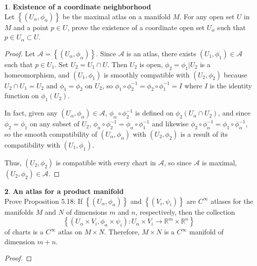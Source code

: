\documentclass[12pt]{article}
\theoremstyle{definition}
\newtheorem{ex}{}[section]
\begin{document}
\begin{ex}
	\textbf{Existence of a coordinate neighborhood} \\
	Let $\left\lbrace \left( U_\alpha, \phi_\alpha \right) \right\rbrace$ be the maximal atlas on a manifold $M$.
	For any open set $U$ in $M$ and a point $p \in U$, prove the existence of a coordinate open set $U_\alpha$ such that $p \in U_\alpha \subset U$.
\end{ex}
\begin{proof}
	Let $\mathcal{A} = \left\lbrace (U_\alpha, \phi_\alpha) \right\rbrace$.
	Since $\mathcal{A}$ is an atlas, there exists $(U_1, \phi_1) \in \mathcal{A}$ such that $p \in U_1$.
	Set $U_2 = U_1 \cap U$.
	Then $U_2$ is open, $\phi_2 = \phi_1|U_2$ is a homeomorphism, and $(U_1, \phi_1)$ is smoothly compatible with $(U_2, \phi_2)$ because $U_2 \cap U_1 = U_2$ and $\phi_1 = \phi_2$ on $U_2$, so $\phi_1 \circ \phi_2^{-1} = \phi_2 \circ \phi_1^{-1} = I$ where $I$ is the identity function on $\phi_1(U_2)$.

	In fact, given any $(U_\alpha, \phi_\alpha) \in \mathcal{A}$, $\phi_\alpha \circ \phi_2^{-1}$ is defined on $\phi_2(U_\alpha \cap U_2)$, and since $\phi_2 = \phi_1$ on any subset of $U_2$, $\phi_\alpha \circ \phi_2^{-1} = \phi_\alpha \circ \phi_1^{-1}$ and likewise $\phi_2 \circ \phi_\alpha^{-1} = \phi_1 \circ \phi_\alpha^{-1}$, so the smooth compatibility of $(U_\alpha, \phi_\alpha)$ with $(U_2, \phi_2)$ is a result of its compatibility with $(U_1, \phi_1)$.

	Thus, $(U_2, \phi_2)$ is compatible with every chart in $\mathcal{A}$, so since $\mathcal{A}$ is maximal, $(U_2, \phi_2) \in \mathcal{A}$.
\end{proof}

\begin{ex}
	\textbf{An atlas for a product manifold} \\
	Prove Proposition 5.18: If $\left\lbrace \left( U_\alpha, \phi_\alpha \right) \right\rbrace$ and $\left\lbrace \left( V_i, \psi_i \right) \right\rbrace$ are $C^\infty$ atlases for the manifolds $M$ and $N$ of dimensions $m$ and $n$, respectively, then the collection \begin{equation*}
		\left\lbrace \left( U_\alpha \times V_i, \phi_\alpha \times \psi_i\right) : U_\alpha \times V_i \to \mathbb{R}^m \times \mathbb{R}^n \right\rbrace
	\end{equation*}
	of charts is a $C^\infty$ atlas on $M \times N$.
	Therefore, $M \times N$ is a $C^\infty$ manifold of dimension $m + n$.
\end{ex}
\begin{proof}

\end{proof}
\end{document}
